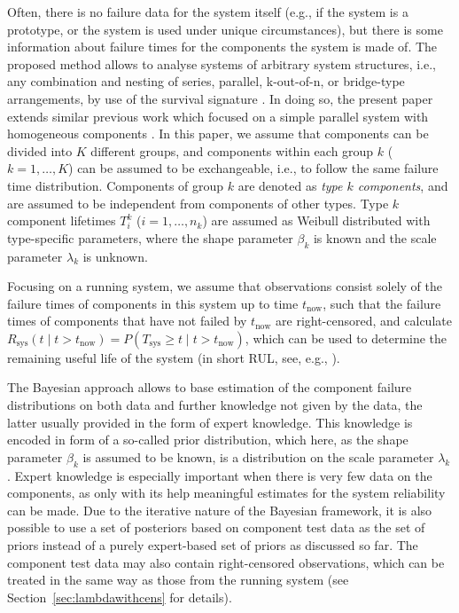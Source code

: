 \documentclass[Journal,letterpaper]{ascelike-new}
\newcommand{\Rsys}{R_\text{sys}}
\def\Rsys{R_\text{sys}}
\def\Tsys{T_\text{sys}}
\def\tnow{t_\text{now}}
\begin{document}
Often, there is no failure data for the system itself
(e.g., if the system is a prototype, or the system is used under unique circumstances),
but there is some information about failure times for the components the system is made of.
The proposed method allows to analyse systems of arbitrary system structures, %
i.e., any combination and nesting of series, parallel, k-out-of-n, or bridge-type arrangements,
by use of the survival signature \cite{2012:survsign}.
In doing so, the present paper extends similar previous work
which focused on a simple parallel system with homogeneous components \cite{2015:walter}.
In this paper, we assume that components can be divided into $K$ different groups,
and components within each group $k$ ($k=1, \ldots, K$) can be assumed to be exchangeable,
i.e., to follow the same failure time distribution.
Components of group $k$ are denoted as \emph{type $k$ components},
and are assumed to be independent from components of other types.
Type $k$ component lifetimes $T_i^k$ ($i = 1, \ldots, n_k$)
are assumed as Weibull distributed with type-specific parameters,
where the shape parameter $\beta_k$ is known
and the scale parameter $\lambda_k$ is unknown.

Focusing on a running system,
we assume that observations consist solely of the failure times of components in this system up to time $\tnow$,
such that the failure times of components that have not failed by $\tnow$ are right-censored,
and calculate $\Rsys(t \mid t > \tnow) = P(\Tsys \geq t \mid t > \tnow)$,
which can be used to determine the remaining useful life of the system
(in short RUL, see, e.g., ).

The Bayesian approach allows to base estimation of the component failure distributions
on both data and further knowledge not given by the data,
the latter usually provided in the form of expert knowledge.
This knowledge is encoded in form of a so-called prior distribution,
which here, as the shape parameter $\beta_k$ is assumed to be known,
is a distribution on the scale parameter $\lambda_k$. %
Expert knowledge is especially important when there is very few data on the components, %
as only with its help meaningful estimates for the system reliability can be made.
%
Due to the iterative nature of the Bayesian framework,
it is also possible to use a set of posteriors based on component test data as the set of priors
instead of a purely expert-based set of priors as discussed so far.
The component test data may also contain right-censored observations,
which can be treated in the same way as those from the running system
(see Section~\ref{sec:lambdawithcens} for details).
\end{document}
